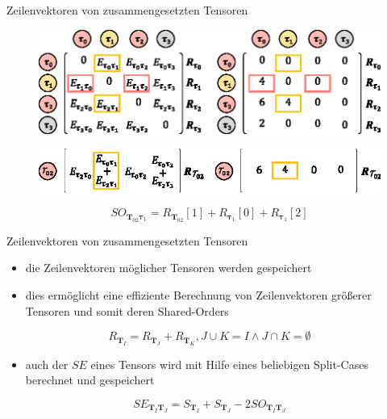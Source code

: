 \documentclass{beamer}
\begin{document}
			\begin{frame}{Zeilenvektoren von zusammengesetzten Tensoren}
				\begin{figure}
					\includegraphics[scale=.9]{figure_05_a_c}
				\end{figure} \pause
				\begin{figure}
					\includegraphics[scale=1.1]{figure_05_b_d}
				\end{figure} \pause
				\begin{equation*}
					SO_{\bm{T}_{02} \bm{\tau}_1} = R_{\bm{T}_{02}}[1] + R_{\bm{\tau}_1}[0] + R_{\bm{\tau}_1}[2]
				\end{equation*}
			\end{frame}

			\begin{frame}{Zeilenvektoren von zusammengesetzten Tensoren}
				\begin{itemize}
					\item die Zeilenvektoren möglicher Tensoren werden gespeichert
					\item dies ermöglicht eine effiziente Berechnung von Zeilenvektoren größerer Tensoren und somit deren Shared-Orders
				\end{itemize}
				\begin{equation*}
					R_{\bm{T}_I} = R_{\bm{T}_J} + R_{\bm{T}_K}, J \cup K = I \wedge J \cap K = \emptyset
				\end{equation*} \pause
				\begin{itemize}
					\item auch der $SE$ eines Tensors wird mit Hilfe eines beliebigen Split-Cases berechnet und gespeichert
				\end{itemize}
				\begin{equation*}
					SE_{\bm{T}_I \bm{T}_J} = S_{\bm{T}_{I}} + S_{\bm{T}_{J}} - 2SO_{\bm{T}_I \bm{T}_J}
				\end{equation*}
			\end{frame}
\end{document}
